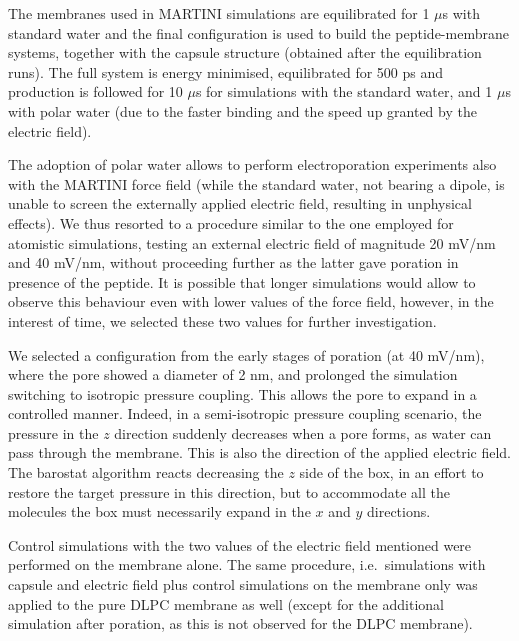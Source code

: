 The membranes used in MARTINI simulations are equilibrated for 1 $\mu$s with standard water and the final configuration is used to build the peptide-membrane systems, together with the capsule structure (obtained after the equilibration runs). The full system is energy minimised, equilibrated for 500 ps and production is followed for 10 $\mu$s for simulations with the standard water, and 1 $\mu$s with polar water (due to the faster binding and the speed up granted by the electric field).

The adoption of polar water allows to perform electroporation experiments also with the MARTINI force field (while the standard water, not bearing a dipole, is unable to screen the externally applied electric field, resulting in unphysical effects).
%
We thus resorted to a procedure similar to the one employed for atomistic simulations, testing an external electric field of magnitude 20 mV/nm and 40 mV/nm, without proceeding further as the latter gave poration in presence of the peptide.
%
It is possible that longer simulations would allow to observe this behaviour even with lower values of the force field, however, in the interest of time, we selected these two values for further investigation.

We selected a configuration from the early stages of poration (at 40 mV/nm), where the pore showed a diameter of 2 nm, and prolonged the simulation switching to isotropic pressure coupling. This allows the pore to expand in a controlled manner. Indeed, in a semi-isotropic pressure coupling scenario, the pressure in the $z$ direction suddenly decreases when a pore forms, as water can pass through the membrane. This is also the direction of the applied electric field. The barostat algorithm reacts decreasing the $z$ side of the box, in an effort to restore the target pressure in this direction, but to accommodate all the molecules the box must necessarily expand in the $x$ and $y$ directions.

Control simulations with the two values of the electric field mentioned were performed on the membrane alone. The same procedure, i.e.\ simulations with capsule and electric field plus control simulations on the membrane only was applied to the pure DLPC membrane as well (except for the additional simulation after poration, as this is not observed for the DLPC membrane).


